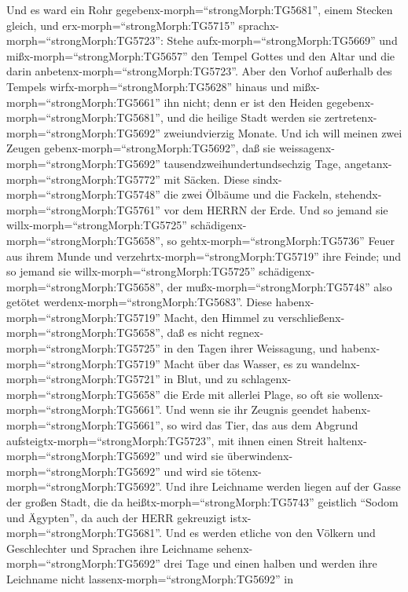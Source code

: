  Und es ward ein Rohr gegebenx-morph=``strongMorph:TG5681'',
einem Stecken gleich, und erx-morph=``strongMorph:TG5715''
sprachx-morph=``strongMorph:TG5723'': Stehe
aufx-morph=``strongMorph:TG5669'' und mißx-morph=``strongMorph:TG5657''
den Tempel Gottes und den Altar und die darin
anbetenx-morph=``strongMorph:TG5723''.  Aber den Vorhof
außerhalb des Tempels wirfx-morph=``strongMorph:TG5628'' hinaus und
mißx-morph=``strongMorph:TG5661'' ihn nicht; denn er ist den Heiden
gegebenx-morph=``strongMorph:TG5681'', und die heilige Stadt werden sie
zertretenx-morph=``strongMorph:TG5692'' zweiundvierzig Monate.
 Und ich will meinen zwei Zeugen
gebenx-morph=``strongMorph:TG5692'', daß sie
weissagenx-morph=``strongMorph:TG5692'' tausendzweihundertundsechzig
Tage, angetanx-morph=``strongMorph:TG5772'' mit Säcken. 
Diese sindx-morph=``strongMorph:TG5748'' die zwei Ölbäume und die
Fackeln, stehendx-morph=``strongMorph:TG5761'' vor dem HERRN der Erde.
 Und so jemand sie willx-morph=``strongMorph:TG5725''
schädigenx-morph=``strongMorph:TG5658'', so
gehtx-morph=``strongMorph:TG5736'' Feuer aus ihrem Munde und
verzehrtx-morph=``strongMorph:TG5719'' ihre Feinde; und so jemand sie
willx-morph=``strongMorph:TG5725''
schädigenx-morph=``strongMorph:TG5658'', der
mußx-morph=``strongMorph:TG5748'' also getötet
werdenx-morph=``strongMorph:TG5683''.  Diese
habenx-morph=``strongMorph:TG5719'' Macht, den Himmel zu
verschließenx-morph=``strongMorph:TG5658'', daß es nicht
regnex-morph=``strongMorph:TG5725'' in den Tagen ihrer Weissagung, und
habenx-morph=``strongMorph:TG5719'' Macht über das Wasser, es zu
wandelnx-morph=``strongMorph:TG5721'' in Blut, und zu
schlagenx-morph=``strongMorph:TG5658'' die Erde mit allerlei Plage, so
oft sie wollenx-morph=``strongMorph:TG5661''.  Und wenn sie
ihr Zeugnis geendet habenx-morph=``strongMorph:TG5661'', so wird das
Tier, das aus dem Abgrund aufsteigtx-morph=``strongMorph:TG5723'', mit
ihnen einen Streit haltenx-morph=``strongMorph:TG5692'' und wird sie
überwindenx-morph=``strongMorph:TG5692'' und wird sie
tötenx-morph=``strongMorph:TG5692''.  Und ihre Leichname
werden liegen auf der Gasse der großen Stadt, die da
heißtx-morph=``strongMorph:TG5743'' geistlich ``Sodom und Ägypten'', da
auch der HERR gekreuzigt istx-morph=``strongMorph:TG5681''. 
Und es werden etliche von den Völkern und Geschlechter und Sprachen ihre
Leichname sehenx-morph=``strongMorph:TG5692'' drei Tage und einen halben
und werden ihre Leichname nicht lassenx-morph=``strongMorph:TG5692'' in
